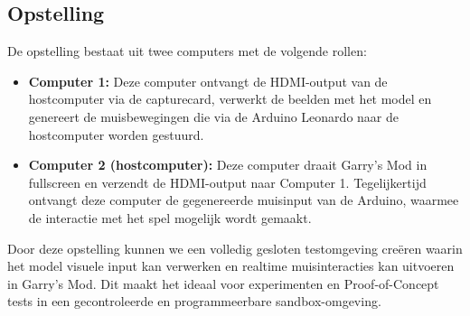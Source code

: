 \subsection{Opstelling}

De opstelling bestaat uit twee computers met de volgende rollen:
\begin{itemize}
\item \textbf{Computer 1:} Deze computer ontvangt de HDMI-output van de hostcomputer via de capturecard, verwerkt de beelden met het model en genereert de muisbewegingen die via de Arduino Leonardo naar de hostcomputer worden gestuurd.
\item \textbf{Computer 2 (hostcomputer):} Deze computer draait Garry's Mod in fullscreen en verzendt de HDMI-output naar Computer 1. Tegelijkertijd ontvangt deze computer de gegenereerde muisinput van de Arduino, waarmee de interactie met het spel mogelijk wordt gemaakt.
\end{itemize}

Door deze opstelling kunnen we een volledig gesloten testomgeving creëren waarin het model visuele input kan verwerken en realtime muisinteracties kan uitvoeren in Garry’s Mod. Dit maakt het ideaal voor experimenten en Proof-of-Concept tests in een gecontroleerde en programmeerbare sandbox-omgeving.